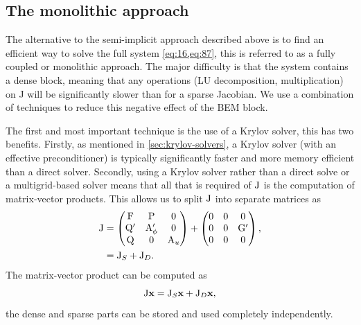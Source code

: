 \subsection{The monolithic approach}
\label{sec:fully-implicit-bem}

The alternative to the semi-implicit approach described above is to find an efficient way to solve the full system \cref{eq:16,eq:87}, this is referred to as a fully coupled or monolithic approach.
The major difficulty is that the system contains a dense block, meaning that any operations (\eg LU decomposition, multiplication) on J will be significantly slower than for a sparse Jacobian.
We use a combination of techniques to reduce this negative effect of the BEM block.

The first and most important technique is the use of a Krylov solver, this has two benefits.
Firstly, as mentioned in \cref{sec:krylov-solvers}, a Krylov solver (with an effective preconditioner) is typically significantly faster and more memory efficient than a direct solver.
Secondly, using a Krylov solver rather than a direct solve or a multigrid-based solver means that all that is required of $\mathrm{J}$ is the computation of matrix-vector products.
This allows us to split $\mathrm{J}$ into separate matrices as
\begin{equation}
  \begin{aligned}
    \mathrm{J} &=
    \begin{pmatrix}
      \mathrm{F}       & \mathrm{P}     &  0 \\
      \mathrm{Q}' &   \mathrm{A}_\phi' &  0  \\
      \mathrm{Q}       &  0       &   \mathrm{A}_u
    \end{pmatrix}
    +
    \begin{pmatrix}
      0       & 0     &  0 \\
      0       &  0    &  \mathrm{G}'  \\
      0       &  0    &  0
    \end{pmatrix},
    \\
    &= \mathrm{J}_S + \mathrm{J}_D.
  \end{aligned}
\end{equation}
The matrix-vector product can be computed as
\begin{equation}
  \mathrm{J} \boldsymbol{\mathrm{x}} = \mathrm{J}_S \boldsymbol{\mathrm{x}} + \mathrm{J}_D \boldsymbol{\mathrm{x}},
\end{equation}
\ie the dense and sparse parts can be stored and used completely independently.

